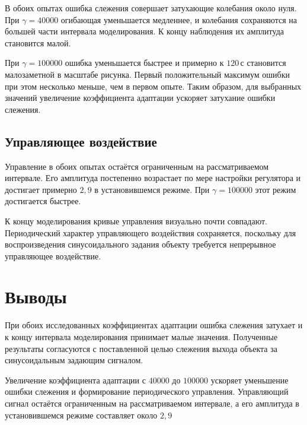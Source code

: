 В обоих опытах ошибка слежения совершает затухающие колебания
около нуля. При $\gamma=40000$ огибающая уменьшается медленнее,
и колебания сохраняются на большей части интервала моделирования.
К концу наблюдения их амплитуда становится малой.

При $\gamma=100000$ ошибка уменьшается быстрее и примерно
к $120\,\text{с}$ становится малозаметной в масштабе рисунка.
Первый положительный максимум ошибки при этом несколько меньше,
чем в первом опыте. Таким образом, для выбранных значений увеличение
коэффициента адаптации ускоряет затухание ошибки слежения.

\subsection{Управляющее воздействие}

Управление в обоих опытах остаётся ограниченным на рассматриваемом
интервале. Его амплитуда постепенно возрастает по мере настройки
регулятора и достигает примерно $2{,}9$ в установившемся режиме.
При $\gamma=100000$ этот режим достигается быстрее.

К концу моделирования кривые управления визуально почти совпадают.
Периодический характер управляющего воздействия сохраняется,
поскольку для воспроизведения синусоидального задания объекту
требуется непрерывное управляющее воздействие.

\section{Выводы}

При обоих исследованных коэффициентах адаптации ошибка слежения
затухает и к концу интервала моделирования принимает малые значения.
Полученные результаты согласуются с поставленной целью слежения
выхода объекта за синусоидальным задающим сигналом.

Увеличение коэффициента адаптации с $40000$ до $100000$ ускоряет
уменьшение ошибки слежения и формирование периодического управления.
Управляющий сигнал остаётся ограниченным на рассматриваемом интервале,
а его амплитуда в установившемся режиме составляет около $2{,}9$

